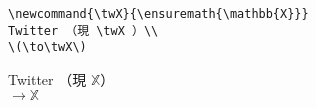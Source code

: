 \documentclass[paper=a7paper,landscape]{jlreq}
\begin{document}
\begin{verbatim}
\newcommand{\twX}{\ensuremath{\mathbb{X}}}
Twitter （現 \twX ）\\
\(\to\twX\)
\end{verbatim}
\hrulefill\par
\newcommand{\twX}{\ensuremath{\mathbb{X}}}
Twitter （現 \twX ）\\
\(\to\twX\)
\end{document}
